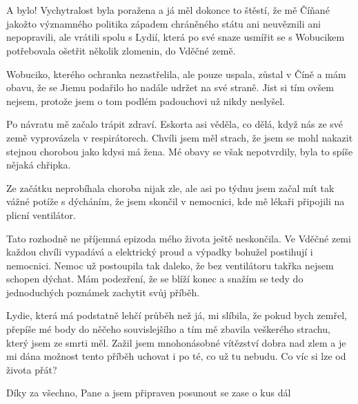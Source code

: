 \chapter{}

A bylo! Vychytralost byla poražena a já měl dokonce to štěstí, že mě Číňané jakožto významného politika západem chráněného státu ani neuvěznili ani nepopravili, ale vrátili spolu s Lydií, která po své snaze usmířit se s Wobucikem potřebovala ošetřit několik zlomenin, do Vděčné země.

Wobuciko, kterého ochranka nezastřelila, ale pouze uspala, zůstal v Číně a mám obavu, že se Jiemu podařilo ho nadále udržet na své straně. Jist si tím ovšem nejsem, protože jsem o tom podlém padouchovi už nikdy neslyšel.
	
Po návratu mě začalo trápit zdraví. Eskorta asi věděla, co dělá, když nás ze své země vyprovázela v respirátorech. Chvíli jsem měl strach, že jsem se mohl nakazit stejnou chorobou jako kdysi má žena. Mé obavy se však nepotvrdily, byla to spíše nějaká chřipka.

Ze začátku neprobíhala choroba nijak zle, ale asi po týdnu jsem začal mít tak vážné potíže s dýcháním, že jsem skončil v nemocnici, kde mě lékaři připojili na plicní ventilátor.

Tato rozhodně ne příjemná epizoda mého života ještě neskončila. Ve Vděčné zemi každou chvíli vypadává a elektrický proud a výpadky bohužel postihují i nemocnici. Nemoc už postoupila tak daleko, že bez ventilátoru takřka nejsem schopen dýchat. Mám podezření, že se blíží konec a snažím se tedy do jednoduchých poznámek zachytit svůj příběh.

Lydie, která má podstatně lehčí průběh než já, mi slíbila, že pokud bych zemřel, přepíše mé body do něčeho souvislejšího a tím mě zbavila veškerého strachu, který jsem ze smrti měl. Zažil jsem mnohonásobné vítězství dobra nad zlem a je mi dána možnost tento příběh uchovat i po té, co už tu nebudu. Co víc si lze od života přát?

Díky za všechno, Pane a jsem připraven posunout se zase o kus dál